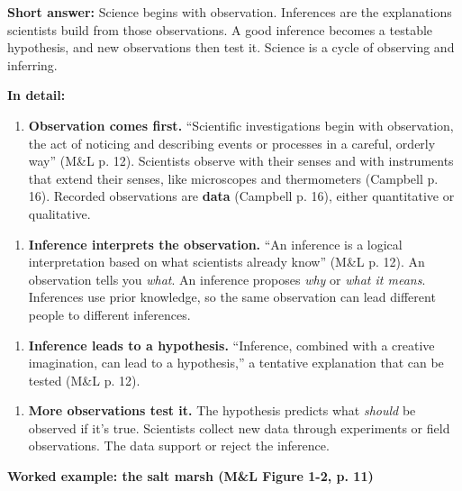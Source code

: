 \documentclass[11pt,letterpaper]{article}
\begin{document}
\textbf{Short answer:} Science begins with observation. Inferences are the explanations scientists build from those observations. A good inference becomes a testable hypothesis, and new observations then test it. Science is a cycle of observing and inferring.

\textbf{In detail:}

\begin{enumerate}
  \item \textbf{Observation comes first.} ``Scientific investigations begin with observation, the act of noticing and describing events or processes in a careful, orderly way'' (M\&L p. 12). Scientists observe with their senses and with instruments that extend their senses, like microscopes and thermometers (Campbell p. 16). Recorded observations are \textbf{data} (Campbell p. 16), either quantitative or qualitative.
\end{enumerate}

\begin{enumerate}
  \item \textbf{Inference interprets the observation.} ``An inference is a logical interpretation based on what scientists already know'' (M\&L p. 12). An observation tells you \emph{what}. An inference proposes \emph{why} or \emph{what it means}. Inferences use prior knowledge, so the same observation can lead different people to different inferences.
\end{enumerate}

\begin{enumerate}
  \item \textbf{Inference leads to a hypothesis.} ``Inference, combined with a creative imagination, can lead to a hypothesis,'' a tentative explanation that can be tested (M\&L p. 12).
\end{enumerate}

\begin{enumerate}
  \item \textbf{More observations test it.} The hypothesis predicts what \emph{should} be observed if it's true. Scientists collect new data through experiments or field observations. The data support or reject the inference.
\end{enumerate}


\textbf{Worked example: the salt marsh (M\&L Figure 1-2, p. 11)}
\end{document}

